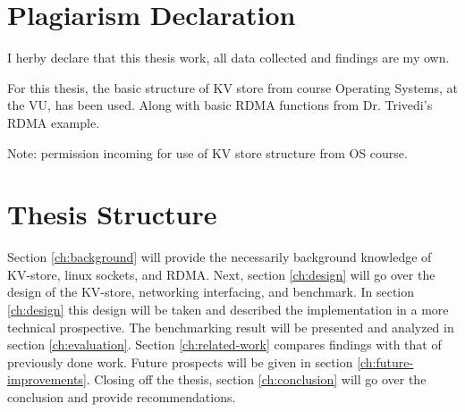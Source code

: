 \section{Plagiarism Declaration}
I herby declare that this thesis work, all data collected and findings are my own.

For this thesis, the basic structure of KV store from course Operating Systems, at the VU, has been used.
Along with basic RDMA functions from Dr. Trivedi's RDMA example\cite{rdma_example}.

Note: permission incoming for use of KV store structure from OS course.

\section{Thesis Structure}
Section \ref{ch:background} will provide the necessarily background knowledge of KV-store, linux sockets, and RDMA.
Next, section \ref{ch:design} will go over the design of the KV-store, networking interfacing, and benchmark.
In section \ref{ch:design} this design will be taken and described the implementation in a more technical prospective.
The benchmarking result will be presented and analyzed in section \ref{ch:evaluation}.
Section \ref{ch:related-work} compares findings with that of previously done work.
Future prospects will be given in section \ref{ch:future-improvements}.
Closing off the thesis, section \ref{ch:conclusion} will go over the conclusion and provide recommendations.